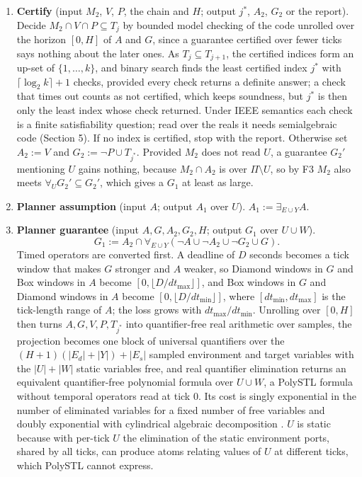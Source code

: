 \documentclass[10pt,a4paper]{article}
\newcommand{\ex}{\exists}
\newcommand{\fa}{\forall}
\begin{document}
\begin{enumerate}
\item \textbf{Certify} (input $M_2$, $V$, $P$, the chain and $H$; output $j^*$, $A_2$, $G_2$ or the report). Decide $M_2\cap V\cap P\subseteq T_j$ by bounded model checking of the code unrolled over the horizon $[0,H]$ of $A$ and $G$, since a guarantee certified over fewer ticks says nothing about the later ones. As $T_j\subseteq T_{j+1}$, the certified indices form an up-set of $\{1,\dots,k\}$, and binary search finds the least certified index $j^*$ with $\lceil\log_2k\rceil+1$ checks, provided every check returns a definite answer; a check that times out counts as not certified, which keeps soundness, but $j^*$ is then only the least index whose check returned. Under IEEE semantics each check is a finite satisfiability question; read over the reals it needs semialgebraic code (Section 5). If no index is certified, stop with the report. Otherwise set $A_2:=V$ and $G_2:=\lnot P\cup T_{j^*}$. Provided $M_2$ does not read $U$, a guarantee $G_2'$ mentioning $U$ gains nothing, because $M_2\cap A_2$ is over $\Pi\setminus U$, so by F3 $M_2$ also meets $\fa_U G_2'\subseteq G_2'$, which gives a $G_1$ at least as large.
\item \textbf{Planner assumption} (input $A$; output $A_1$ over $U$). $A_1:=\ex_{E\cup Y}A$.
\item \textbf{Planner guarantee} (input $A,G,A_2,G_2,H$; output $G_1$ over $U\cup W$).
\[G_1:=A_2\cap\fa_{E\cup Y}(\lnot A\cup\lnot A_2\cup\lnot G_2\cup G).\]
Timed operators are converted first. A deadline of $D$ seconds becomes a tick window that makes $G$ stronger and $A$ weaker, so Diamond windows in $G$ and Box windows in $A$ become $[0,\lfloor D/dt_{\max}\rfloor]$, and Box windows in $G$ and Diamond windows in $A$ become $[0,\lfloor D/dt_{\min}\rfloor]$, where $[dt_{\min},dt_{\max}]$ is the tick-length range of $A$; the loss grows with $dt_{\max}/dt_{\min}$. Unrolling over $[0,H]$ then turns $A,G,V,P,T_{j^*}$ into quantifier-free real arithmetic over samples, the projection becomes one block of universal quantifiers over the $(H+1)(|E_d|+|Y|)+|E_s|$ sampled environment and target variables with the $|U|+|W|$ static variables free, and real quantifier elimination returns an equivalent quantifier-free polynomial formula over $U\cup W$, a PolySTL formula without temporal operators read at tick $0$. Its cost is singly exponential in the number of eliminated variables for a fixed number of free variables \cite{bpr} and doubly exponential with cylindrical algebraic decomposition \cite{collins}. $U$ is static because with per-tick $U$ the elimination of the static environment ports, shared by all ticks, can produce atoms relating values of $U$ at different ticks, which PolySTL cannot express.


\end{enumerate}
\end{document}
